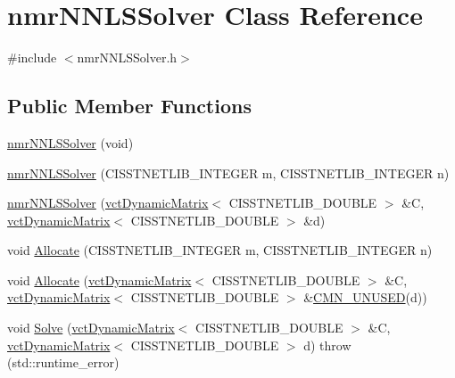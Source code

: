 \hypertarget{classnmr_n_n_l_s_solver}{}\section{nmr\+N\+N\+L\+S\+Solver Class Reference}
\label{classnmr_n_n_l_s_solver}


{\ttfamily \#include $<$nmr\+N\+N\+L\+S\+Solver.\+h$>$}

\subsection*{Public Member Functions}
\begin{DoxyCompactItemize}
\item 
\hyperlink{classnmr_n_n_l_s_solver_ae72f26b588bf76a9796caa87e161eeaa}{nmr\+N\+N\+L\+S\+Solver} (void)
\item 
\hyperlink{classnmr_n_n_l_s_solver_aa454d78491495f93508c74282e9160cc}{nmr\+N\+N\+L\+S\+Solver} (C\+I\+S\+S\+T\+N\+E\+T\+L\+I\+B\+\_\+\+I\+N\+T\+E\+G\+E\+R m, C\+I\+S\+S\+T\+N\+E\+T\+L\+I\+B\+\_\+\+I\+N\+T\+E\+G\+E\+R n)
\item 
\hyperlink{classnmr_n_n_l_s_solver_a26bfc195a5cd11ce6613851ac7236fbb}{nmr\+N\+N\+L\+S\+Solver} (\hyperlink{classvct_dynamic_matrix}{vct\+Dynamic\+Matrix}$<$ C\+I\+S\+S\+T\+N\+E\+T\+L\+I\+B\+\_\+\+D\+O\+U\+B\+L\+E $>$ \&C, \hyperlink{classvct_dynamic_matrix}{vct\+Dynamic\+Matrix}$<$ C\+I\+S\+S\+T\+N\+E\+T\+L\+I\+B\+\_\+\+D\+O\+U\+B\+L\+E $>$ \&d)
\item 
void \hyperlink{classnmr_n_n_l_s_solver_a5894bd80cf3345464f2a8eb99f2291af}{Allocate} (C\+I\+S\+S\+T\+N\+E\+T\+L\+I\+B\+\_\+\+I\+N\+T\+E\+G\+E\+R m, C\+I\+S\+S\+T\+N\+E\+T\+L\+I\+B\+\_\+\+I\+N\+T\+E\+G\+E\+R n)
\item 
void \hyperlink{classnmr_n_n_l_s_solver_ab2caa7c0b2b789eb73c37b9a83a7a615}{Allocate} (\hyperlink{classvct_dynamic_matrix}{vct\+Dynamic\+Matrix}$<$ C\+I\+S\+S\+T\+N\+E\+T\+L\+I\+B\+\_\+\+D\+O\+U\+B\+L\+E $>$ \&C, \hyperlink{classvct_dynamic_matrix}{vct\+Dynamic\+Matrix}$<$ C\+I\+S\+S\+T\+N\+E\+T\+L\+I\+B\+\_\+\+D\+O\+U\+B\+L\+E $>$ \&\hyperlink{cmn_portability_8h_a021894e2626935fa2305434b1e893ff6}{C\+M\+N\+\_\+\+U\+N\+U\+S\+E\+D}(d))
\item 
void \hyperlink{classnmr_n_n_l_s_solver_aa1a61c6d219e030ca7d7828582a77a04}{Solve} (\hyperlink{classvct_dynamic_matrix}{vct\+Dynamic\+Matrix}$<$ C\+I\+S\+S\+T\+N\+E\+T\+L\+I\+B\+\_\+\+D\+O\+U\+B\+L\+E $>$ \&C, \hyperlink{classvct_dynamic_matrix}{vct\+Dynamic\+Matrix}$<$ C\+I\+S\+S\+T\+N\+E\+T\+L\+I\+B\+\_\+\+D\+O\+U\+B\+L\+E $>$ d)  throw (std\+::runtime\+\_\+error)

\end{DoxyCompactItemize}
